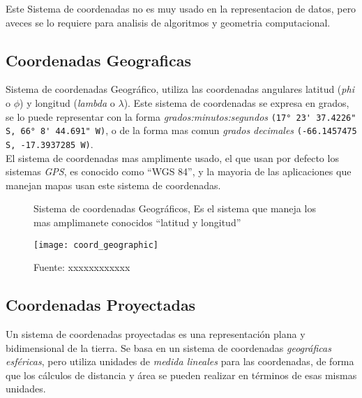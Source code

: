        Este Sistema de coordenadas no es muy usado en la representacion de datos, pero aveces se lo requiere para analisis de algoritmos y geometria computacional.

      \subsection{Coordenadas Geograficas} %
      \label{sub:coordenadas_geograficas}
        Sistema de coordenadas Geográfico, utiliza las coordenadas angulares latitud  (\emph{phi} o ${\phi}$) y longitud (\emph{lambda} o ${\lambda}$). Este sistema de coordenadas se expresa en grados, se lo puede representar con la forma \emph{grados:minutos:segundos }\verb|(17° 23' 37.4226" S, 66° 8' 44.691" W)|, o de la forma mas comun \emph{grados decimales} \verb|(-66.1457475 S, -17.3937285 W)|.\\

        El sistema de coordenadas  mas amplimente usado, el que usan por defecto los sistemas \emph{GPS}, es conocido como ``WGS 84'', y la mayoria de las aplicaciones que manejan mapas usan este sistema de coordenadas.\\

        \begin{figure}[H]
          \begin{center}
            \caption[Sistema de coordenadas Geográficos]{Sistema de coordenadas Geográficos, Es el sistema que maneja los mas amplimanete conocidos ``latitud y longitud''}
            \label{fig:coord_geographic}
            \texttt{[image: coord\_geographic]}
            \caption*{Fuente: xxxxxxxxxxxx}
          \end{center}

        \end{figure}


      \subsection{Coordenadas Proyectadas} %
      \label{sub:coordenadas_proyectadas}
        Un sistema de coordenadas proyectadas es una representación plana y bidimensional de la  tierra. Se basa en un sistema de coordenadas \emph{geográficas esf\'ericas}, pero utiliza unidades de \emph{medida lineales} para las coordenadas, de forma que los cálculos de distancia y área se pueden realizar en términos de esas mismas unidades.\cite{projected} \\

